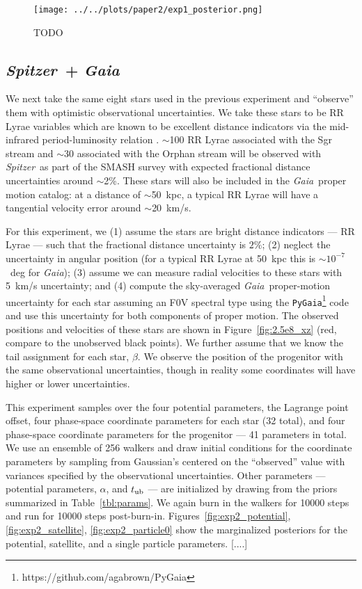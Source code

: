 \documentclass[letterpaper,12pt,preprint]{aastex}
\newcommand{\project}[1]{\textsl{#1}}
\newcommand{\gaia}{\project{Gaia}}
\newcommand{\spitzer}{\project{Spitzer}~}
\newcommand{\tub}{t_{\rm ub}}
\newcommand{\Loffset}{\alpha}
\begin{document}
\begin{figure}[!ht]
\begin{center}
\texttt{[image: ../../plots/paper2/exp1\_posterior.png]}
\caption{ TODO  }\label{fig:exp1_posterior}
\end{center}
\end{figure}

\subsection{\spitzer + \gaia}
We next take the same eight stars used in the previous experiment and ``observe'' them with optimistic observational uncertainties. We take these stars to be RR Lyrae variables which are known to be excellent distance indicators via the mid-infrared period-luminosity relation \citep[as shown in, e.g.,][]{madore12}. $\sim$100 RR Lyrae associated with the Sgr stream and $\sim$30 associated with the Orphan stream will be observed with \spitzer as part of the SMASH survey \citep{smashprop} with expected fractional distance uncertainties around $\sim$2\%. These stars will also be included in the \gaia\, proper motion catalog: at a distance of $\sim$50~kpc, a typical RR Lyrae will have a tangential velocity error around $\sim$20~km/s.

For this experiment, we (1) assume the stars are bright distance indicators --- RR Lyrae --- such that the fractional distance uncertainty is $2\%$; (2) neglect the uncertainty in angular position (for a typical RR Lyrae at 50~kpc this is $\sim$$10^{-7}$~deg for \gaia); (3) assume we can measure radial velocities to these stars with 5~km/s uncertainty; and (4) compute the sky-averaged \gaia\, proper-motion uncertainty for each star assuming an F0V spectral type using the \texttt{PyGaia}\footnote{https://github.com/agabrown/PyGaia} code and use this uncertainty for both components of proper motion. The observed positions and velocities of these stars are shown in Figure~\ref{fig:2.5e8_xz} (red, compare to the unobserved black points). We further assume that we know the tail assignment for each star, $\beta$. We observe the position of the progenitor with the same observational uncertainties, though in reality some coordinates will have higher or lower uncertainties.

This experiment samples over the four potential parameters, the Lagrange point offset, four phase-space coordinate parameters for each star (32 total), and four phase-space coordinate parameters for the progenitor --- 41 parameters in total. We use an ensemble of 256 walkers and draw initial conditions for the coordinate parameters by sampling from Gaussian's centered on the ``observed'' value with variances specified by the observational uncertainties. Other parameters --- potential parameters, $\Loffset$, and $\tub$ --- are initialized by drawing from the priors summarized in Table~\ref{tbl:params}. We again burn in the walkers for 10000 steps and run for 10000 steps post-burn-in. Figures~\ref{fig:exp2_potential}, \ref{fig:exp2_satellite}, \ref{fig:exp2_particle0} show the marginalized posteriors for the potential, satellite, and a single particle parameters. [....]
\end{document}
